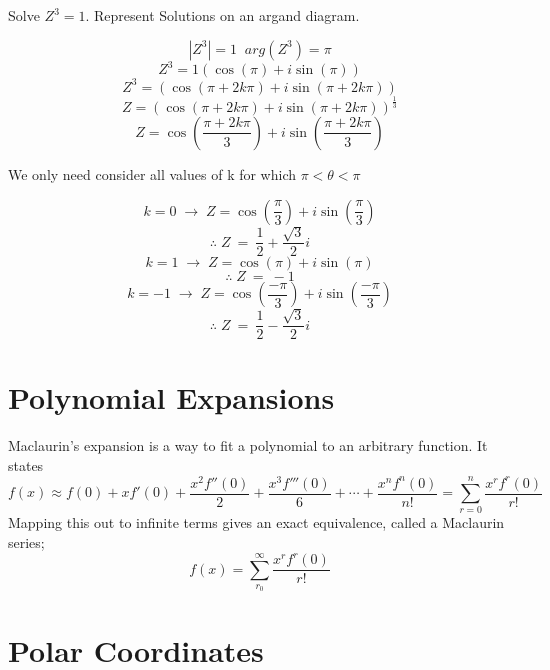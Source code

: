 \documentclass{article}
\begin{document}
Solve \(Z^3=1\). Represent Solutions on an argand diagram.

\[|Z^3|=1 \;\; arg(Z^3)=\pi\]
\[Z^3=1\left(\cos\left(\pi\right)+i\sin\left(\pi\right)\right)\]
\[Z^3=\left(\cos\left(\pi+2k\pi\right)+i\sin\left(\pi+2k\pi\right)\right)\]
\[Z=\left(\cos\left(\pi+2k\pi\right)+i\sin\left(\pi+2k\pi\right)\right)^{\frac{1}{3}}\]
\[Z=\cos\left(\frac{\pi+2k\pi}{3}\right)+i\sin\left(\frac{\pi+2k\pi}{3}\right)\]

\noindent We only need consider all values of k for which \(\pi<\theta<\pi\)

\[k=0 \;\rightarrow\; Z=\cos\left(\frac{\pi}{3}\right)+i\sin\left(\frac{\pi}{3}\right)\]
\[\therefore \; Z \:=\: \frac{1}{2}+\frac{\sqrt{3}}{2}i\]
\[k=1 \;\rightarrow\; Z=\cos\left(\pi\right)+i\sin\left(\pi\right)\]
\[\therefore \; Z \:=\: -1\]
\[k=-1 \;\rightarrow\; Z=\cos\left(\frac{-\pi}{3}\right)+i\sin\left(\frac{-\pi}{3}\right)\]
\[\therefore \; Z \:=\: \frac{1}{2}-\frac{\sqrt{3}}{2}i\]

\begin{center}
\end{center}

\section{Polynomial Expansions}

Maclaurin's expansion is a way to fit a polynomial to an arbitrary function. It
states \[f(x) \approx f(0) + xf'(0) + \frac{x^2f''(0)}{2} +
    \frac{x^3f'''(0)}{6} + \cdots + \frac{x^nf^n(0)}{n!} = \sum_{r=0}^{n}
\frac{x^rf^r(0)}{r!}\] Mapping this out to infinite terms gives an exact
equivalence, called a Maclaurin series; \[f(x) = \sum_{r_0}^{\infty}
\frac{x^rf^r(0)}{r!}\]

\section{Polar Coordinates}
\end{document}
